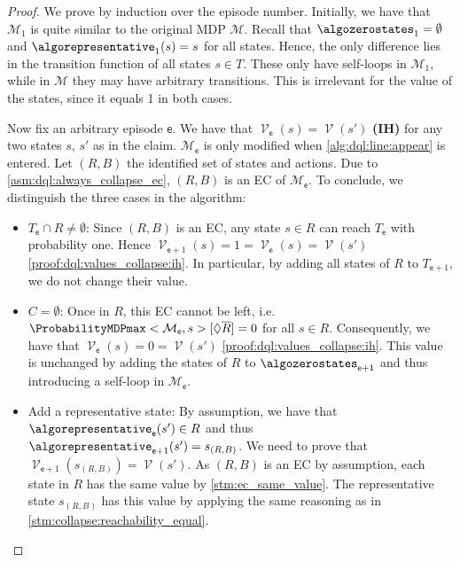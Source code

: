 \documentclass{article}
\makeatletter
\newcommand{\intersectionSym}{\cap}
\newcommand{\intersectionBin}{\mathbin{\intersectionSym}}
\newcommand{\intersection}{\intersectionBin}
\newcommand{\MDP}{\mathcal{M}}
\newcommand{\reach}{\Diamond}
\DeclareMathOperator{\val}{\mathcal{V}}
\newcommand{\targetset}{T}
\newcommand{\algoepisode}{\mathsf{e}}
\def\alabel#1#2{\begingroup
	\textbf{(#2)}\def\@currentlabel{\textbf{[#2]}}\phantomsection\label{#1}\endgroup
}
\makeatother
\begin{document}
\begin{proof}
	We prove by induction over the episode number.
	Initially, we have that $\MDP_1$ is quite similar to the original MDP $\MDP$.
	Recall that $\algozerostates_1 = \emptyset$ and $\algorepresentative_1(s) = s$ for all states.
	Hence, the only difference lies in the transition function of all states $s \in \targetset$.
	These only have self-loops in $\MDP_1$, while in $\MDP$ they may have arbitrary transitions.
	This is irrelevant for the value of the states, since it equals 1 in both cases.

	Now fix an arbitrary episode $\algoepisode$.
	We have that $\val_\algoepisode(s) = \val(s')$ \alabel{proof:dql:values_collapse:ih}{IH} for any two states $s$, $s'$ as in the claim.
	$\MDP_\algoepisode$ is only modified when \cref{alg:dql:line:appear} is entered.
	Let $(R, B)$ the identified set of states and actions.
	Due to \cref{asm:dql:always_collapse_ec}, $(R, B)$ is an EC of $\MDP_\algoepisode$.
	To conclude, we distinguish the three cases in the algorithm:
	\begin{itemize}
		\item
		$\targetset_\algoepisode \intersection R \neq \emptyset$: Since $(R, B)$ is an EC, any state $s \in R$ can reach $\targetset_\algoepisode$ with probability one.
		Hence $\val_{\algoepisode + 1}(s) = 1 = \val_\algoepisode(s) = \val(s')$ \ref{proof:dql:values_collapse:ih}.
		In particular, by adding all states of $R$ to $\targetset_{\algoepisode + 1}$, we do not change their value.

		\item
		$C = \emptyset$: Once in $R$, this EC cannot be left, i.e.\ $\ProbabilityMDPmax<\MDP_\algoepisode, s>[\reach \overline{R}] = 0$ for all $s \in R$.
		Consequently, we have that $\val_\algoepisode(s) = 0 = \val(s')$ \ref{proof:dql:values_collapse:ih}.
		This value is unchanged by adding the states of $R$ to $\algozerostates_{\algoepisode + 1}$ and thus introducing a self-loop in $\MDP_\algoepisode$.

		\item
		Add a representative state:
		By assumption, we have that $\algorepresentative_\algoepisode(s') \in R$ and thus $\algorepresentative_{\algoepisode + 1}(s') = s_{(R, B)}$.
		We need to prove that $\val_{\algoepisode + 1}(s_{(R, B)}) = \val(s')$.
		As $(R, B)$ is an EC by assumption, each state in $R$ has the same value by \cref{stm:ec_same_value}.
		The representative state $s_{(R,B)}$ has this value by applying the same reasoning as in \cref{stm:collapse:reachability_equal}. \qedhere
	\end{itemize}
\end{proof}
\end{document}
